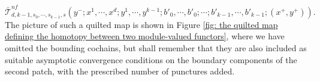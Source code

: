 \documentclass{amsart}
\numberwithin{equation}{section}
\numberwithin{figure}{section}
\begin{document}
\begin{equation}\label{moduli space defining homotopy between the module-valued functors}
\bar{\mathcal{T}}^{nf}_{d, k-1,s_{0}, \cdots, s_{k-1}, s}(y^{-}; x^{1}, \cdots, x^{d}; y^{1}, \cdots, y^{k-1}; b'_{0}, \cdots, b'_{0}; \cdots; b'_{k-1}, \cdots, b'_{k-1}; (x^{+}, y^{+})).
\end{equation}
The picture of such a quilted map is shown in Figure \ref{fig: the quilted map defining the homotopy between two module-valued functors}, where we have omitted the bounding cochains, but shall remember that they are also included as suitable asymptotic convergence conditions on the boundary components of the second patch, with the prescribed number of punctures added. \par

\end{document}
